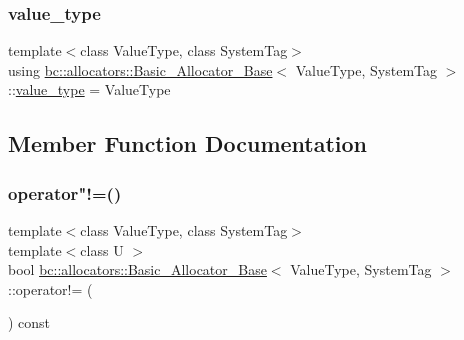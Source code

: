 \mbox{\label{structbc_1_1allocators_1_1Basic__Allocator__Base_a7d9eca7878880a820908b57bdcb94501}} 
\subsubsection{\texorpdfstring{value\+\_\+type}{value\_type}}
{\footnotesize\ttfamily template$<$class Value\+Type, class System\+Tag$>$ \\
using \hyperlink{structbc_1_1allocators_1_1Basic__Allocator__Base}{bc\+::allocators\+::\+Basic\+\_\+\+Allocator\+\_\+\+Base}$<$ Value\+Type, System\+Tag $>$\+::\hyperlink{structbc_1_1allocators_1_1Basic__Allocator__Base_a7d9eca7878880a820908b57bdcb94501}{value\+\_\+type} =  Value\+Type}



\subsection{Member Function Documentation}
\mbox{\label{structbc_1_1allocators_1_1Basic__Allocator__Base_a595df39ca6edee505366ff39ab6d2a4f}} 
\subsubsection{\texorpdfstring{operator"!=()}{operator!=()}}
{\footnotesize\ttfamily template$<$class Value\+Type, class System\+Tag$>$ \\
template$<$class U $>$ \\
bool \hyperlink{structbc_1_1allocators_1_1Basic__Allocator__Base}{bc\+::allocators\+::\+Basic\+\_\+\+Allocator\+\_\+\+Base}$<$ Value\+Type, System\+Tag $>$\+::operator!= (\begin{DoxyParamCaption}\item[{const \hyperlink{structbc_1_1allocators_1_1Basic__Allocator__Base}{Basic\+\_\+\+Allocator\+\_\+\+Base}$<$ U, System\+Tag $>$ \&}]{ }\end{DoxyParamCaption}) const\hspace{0.3cm}{\ttfamily [inline]}}

